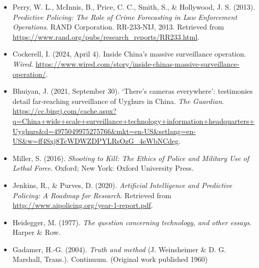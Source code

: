\documentclass[man, noextraspace]{apa7} %
\begin{document}
\begin{itemize}
\item Perry, W. L., McInnis, B., Price, C. C., Smith, S., \& Hollywood, J. S. (2013). \textit{Predictive Policing: The Role of Crime Forecasting in Law Enforcement Operations}. RAND Corporation. RR-233-NIJ, 2013. Retrieved from \url{https://www.rand.org/pubs/research_reports/RR233.html}.

\item Cockerell, I. (2024, April 4). Inside China's massive surveillance operation. \textit{Wired}. \url{https://www.wired.com/story/inside-chinas-massive-surveillance-operation/}.

\item Bhuiyan, J. (2021, September 30). ‘There’s cameras everywhere’: testimonies detail far-reaching surveillance of Uyghurs in China. \textit{The Guardian}. \url{https://cc.bingj.com/cache.aspx?q=China+wide+scale+surveillance+technology+information+headquarters+Uyghurs&d=4975049975275766&mkt=en-US&setlang=en-US&w=ff4Sxj8TcWDWZDPYLRsOzG_4eWbNCdeg}.

\item Miller, S. (2016). \textit{Shooting to Kill: The Ethics of Police and Military Use of Lethal Force}. Oxford; New York: Oxford University Press.

\item Jenkins, R., \& Purves, D. (2020). \textit{Artificial Intelligence and Predictive Policing: A Roadmap for Research}. Retrieved from \url{http://www.aipolicing.org/year-1-report.pdf}.

\item Heidegger, M. (1977). \textit{The question concerning technology, and other essays}. Harper \& Row.

\item Gadamer, H.-G. (2004). \textit{Truth and method} (J. Weinsheimer \& D. G. Marshall, Trans.). Continuum. (Original work published 1960)
    
\end{itemize}
\printbibliography
\end{document}
